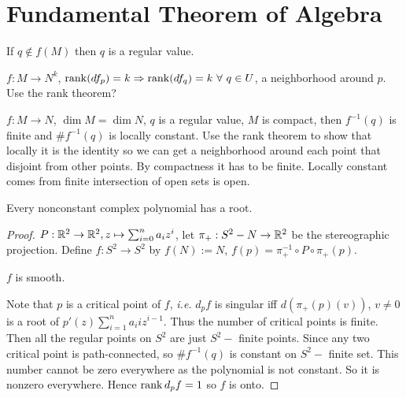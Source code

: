 \documentclass[12pt,class=article,crop=false]{standalone}
\begin{document}
\section{Fundamental Theorem of Algebra}
\begin{remark}
If $ q \not\in f(M)$ then $ q$ is a regular value.
\end{remark}

\begin{eg}
$ f:M \to N^{k}$, $ \rank (df_p) = k \implies \rank(df_q) = k \ \forall \ q \in U$, a neighborhood around $ p$. Use the rank theorem?
\end{eg}
\begin{eg}
$ f: M \to N$, $ \dim M = \dim N$,  $ q$ is a regular value,  $ M$ is compact, then  $ f^{-1}(q)$ is finite and $ \# f^{-1}(q)$ is locally constant. Use the rank theorem to show that locally it is the identity so we can get a neighborhood around each point that disjoint from other points. By compactness it has to be finite. Locally constant comes from finite intersection of open sets is open.
\end{eg}

\begin{thm}
Every nonconstant complex polynomial has a root.
\end{thm}
\begin{proof}
$ P: \mathbb{R}^2 \to \mathbb{R}^2, z \mapsto \sum_{ i= 0}^{ n} a_i z^{i}$, let $ \pi_+: S^2 - N \to \mathbb{R}^2$ be the stereographic projection. Define $ f: S^2 \to S^2$ by $ f(N) := N$,  $ f(p) = \pi_+^{-1} \circ P \circ \pi_+(p)$.
\begin{claim}
$ f$ is smooth.
\end{claim}

Note that $ p$ is a critical point of  $ f$,  \emph{i.e.} $ d_pf$ is singular iff $ d(\pi_+(p)(v))$, $ v\neq 0$ is a root of $ p'(z) \sum_{ i= 1}^{ n} a_i i z^{i-1}$. Thus the number of critical points is finite. Then all the regular points on $ S^2$ are just $ S^2 -$ finite points. Since any two critical point is path-connected, so $ \# f^{-1}(q)$ is constant on $ S^2 - $ finite set. This number cannot be zero everywhere as the polynomial is not constant. So it is nonzero everywhere. Hence $ \operatorname{rank} d_p f = 1$ so  $ f$ is onto.
\end{proof}
\end{document}
